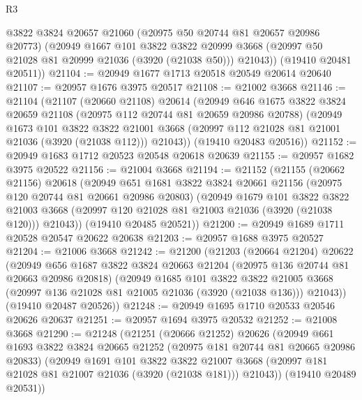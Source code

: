 \begin{lexlean}{R3}
\begin{coremodule}
        @3822
        @3824
        @20657
        @21060
        (@20975 @50 @20744 @81 @20657 @20986 @20773)
        (@20949
          @1667
          @101
          @3822
          @3822
          @20999
          @3668
          (@20997 @50 @21028 @81 @20999 @21036 (@3920 (@21038 @50)))
          @21043))
      (@19410 @20481 @20511))
@21104 := @20949 @1677 @1713 @20518 @20549 @20614 @20640
@21107 := @20957 @1676 @3975 @20517
@21108 := @21002 @3668
@21146 := @21104
    (@21107
      (@20660 @21108)
      @20614
      (@20949
        @646
        @1675
        @3822
        @3824
        @20659
        @21108
        (@20975 @112 @20744 @81 @20659 @20986 @20788)
        (@20949
          @1673
          @101
          @3822
          @3822
          @21001
          @3668
          (@20997 @112 @21028 @81 @21001 @21036 (@3920 (@21038 @112)))
          @21043))
      (@19410 @20483 @20516))
@21152 := @20949 @1683 @1712 @20523 @20548 @20618 @20639
@21155 := @20957 @1682 @3975 @20522
@21156 := @21004 @3668
@21194 := @21152
    (@21155
      (@20662 @21156)
      @20618
      (@20949
        @651
        @1681
        @3822
        @3824
        @20661
        @21156
        (@20975 @120 @20744 @81 @20661 @20986 @20803)
        (@20949
          @1679
          @101
          @3822
          @3822
          @21003
          @3668
          (@20997 @120 @21028 @81 @21003 @21036 (@3920 (@21038 @120)))
          @21043))
      (@19410 @20485 @20521))
@21200 := @20949 @1689 @1711 @20528 @20547 @20622 @20638
@21203 := @20957 @1688 @3975 @20527
@21204 := @21006 @3668
@21242 := @21200
    (@21203
      (@20664 @21204)
      @20622
      (@20949
        @656
        @1687
        @3822
        @3824
        @20663
        @21204
        (@20975 @136 @20744 @81 @20663 @20986 @20818)
        (@20949
          @1685
          @101
          @3822
          @3822
          @21005
          @3668
          (@20997 @136 @21028 @81 @21005 @21036 (@3920 (@21038 @136)))
          @21043))
      (@19410 @20487 @20526))
@21248 := @20949 @1695 @1710 @20533 @20546 @20626 @20637
@21251 := @20957 @1694 @3975 @20532
@21252 := @21008 @3668
@21290 := @21248
    (@21251
      (@20666 @21252)
      @20626
      (@20949
        @661
        @1693
        @3822
        @3824
        @20665
        @21252
        (@20975 @181 @20744 @81 @20665 @20986 @20833)
        (@20949
          @1691
          @101
          @3822
          @3822
          @21007
          @3668
          (@20997 @181 @21028 @81 @21007 @21036 (@3920 (@21038 @181)))
          @21043))
      (@19410 @20489 @20531))

\end{coremodule}
\end{lexlean}
